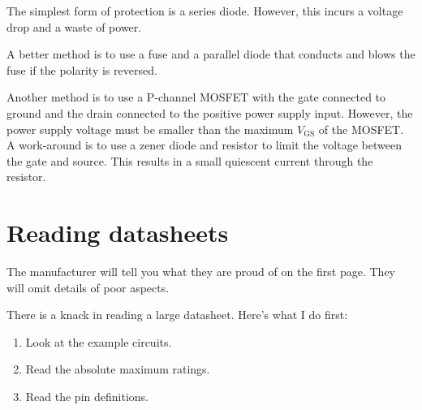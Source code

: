 The simplest form of protection is a series diode.  However, this
incurs a voltage drop and a waste of power.

A better method is to use a fuse and a parallel diode that conducts
and blows the fuse if the polarity is reversed.

Another method is to use a P-channel MOSFET with the gate connected to
ground and the drain connected to the positive power supply input.
However, the power supply voltage must be smaller than the maximum
$V_{\mathrm{GS}}$ of the MOSFET.  A work-around is to use a zener
diode and resistor to limit the voltage between the gate and source.
This results in a small quiescent current through the resistor.


\section{Reading datasheets}

The manufacturer will tell you what they are proud of on the first
page.  They will omit details of poor aspects.

There is a knack in reading a large datasheet.  Here's what I do
first:

\begin{enumerate}
\item Look at the example circuits.

\item Read the absolute maximum ratings.

\item Read the pin definitions.
\end{enumerate}


